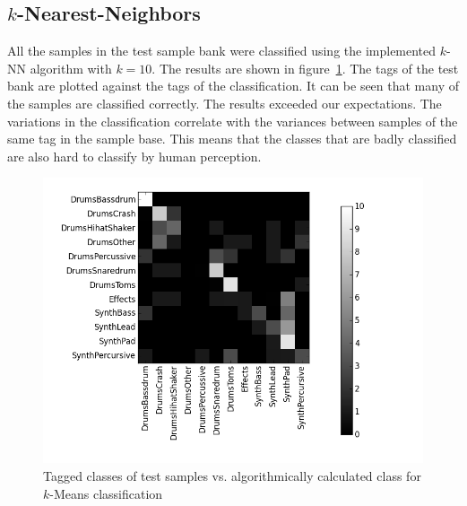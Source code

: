 \subsection{$k$-Nearest-Neighbors}
All the samples in the test sample bank were classified using the implemented $k$-NN algorithm with $k=10$. The results are shown in figure~\ref{fig:k-NN}. The tags of the test bank are plotted against the tags of the classification. It can be seen that many of the samples are classified correctly. The results exceeded our expectations. The variations in the classification correlate with the variances between samples of the same tag in the sample base. This means that the classes that are badly classified are also hard to classify by human perception.

\begin{figure}[htbp]
\centering
\includegraphics[width=0.45\linewidth]{../plots/knn.png}
\caption{Tagged classes of test samples vs. algorithmically calculated class for $k$-Means classification}
\label{fig:k-NN}
\end{figure}
